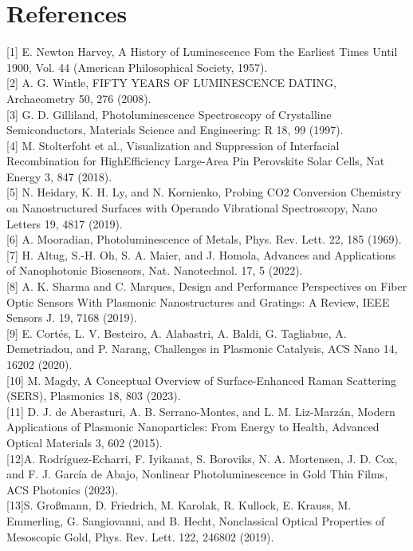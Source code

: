 \documentclass[10pt]{article}
\begin{document}
\section*{References}
[1] E. Newton Harvey, A History of Luminescence Fom the Earliest Times Until 1900, Vol. 44 (American Philosophical Society, 1957).\\[0pt]
[2] A. G. Wintle, FIFTY YEARS OF LUMINESCENCE DATING, Archaeometry 50, 276 (2008).\\[0pt]
[3] G. D. Gilliland, Photoluminescence Spectroscopy of Crystalline Semiconductors, Materials Science and Engineering: R 18, 99 (1997).\\[0pt]
[4] M. Stolterfoht et al., Visualization and Suppression of Interfacial Recombination for HighEfficiency Large-Area Pin Perovskite Solar Cells, Nat Energy 3, 847 (2018).\\[0pt]
[5] N. Heidary, K. H. Ly, and N. Kornienko, Probing CO2 Conversion Chemistry on Nanostructured Surfaces with Operando Vibrational Spectroscopy, Nano Letters 19, 4817 (2019).\\[0pt]
[6] A. Mooradian, Photoluminescence of Metals, Phys. Rev. Lett. 22, 185 (1969).\\[0pt]
[7] H. Altug, S.-H. Oh, S. A. Maier, and J. Homola, Advances and Applications of Nanophotonic Biosensors, Nat. Nanotechnol. 17, 5 (2022).\\[0pt]
[8] A. K. Sharma and C. Marques, Design and Performance Perspectives on Fiber Optic Sensors With Plasmonic Nanostructures and Gratings: A Review, IEEE Sensors J. 19, 7168 (2019).\\[0pt]
[9] E. Cortés, L. V. Besteiro, A. Alabastri, A. Baldi, G. Tagliabue, A. Demetriadou, and P. Narang, Challenges in Plasmonic Catalysis, ACS Nano 14, 16202 (2020).\\[0pt]
[10] M. Magdy, A Conceptual Overview of Surface-Enhanced Raman Scattering (SERS), Plasmonics 18, 803 (2023).\\[0pt]
[11] D. J. de Aberasturi, A. B. Serrano-Montes, and L. M. Liz-Marzán, Modern Applications of Plasmonic Nanoparticles: From Energy to Health, Advanced Optical Materials 3, 602 (2015).\\[0pt]
[12]A. Rodríguez-Echarri, F. Iyikanat, S. Boroviks, N. A. Mortensen, J. D. Cox, and F. J. García de Abajo, Nonlinear Photoluminescence in Gold Thin Films, ACS Photonics (2023).\\[0pt]
[13]S. Großmann, D. Friedrich, M. Karolak, R. Kullock, E. Krauss, M. Emmerling, G. Sangiovanni, and B. Hecht, Nonclassical Optical Properties of Mesoscopic Gold, Phys. Rev. Lett. 122, 246802 (2019).\\[0pt]
\end{document}
